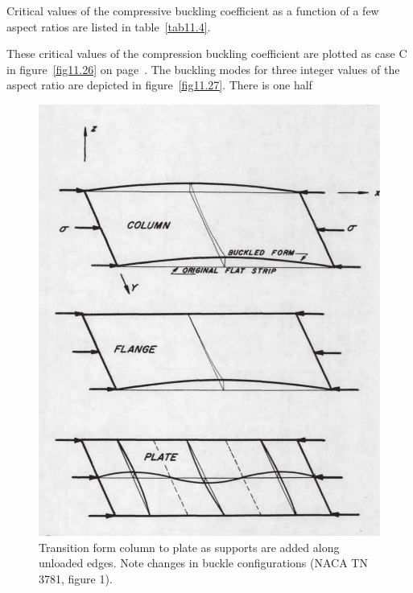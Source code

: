 \documentclass{AeroStructure-ERJohnson}
\begin{document}
\vspace*{-1pc}

Critical values of the compressive buckling coefficient as a function of a few aspect ratios are listed in table~\ref{tab11.4}.

These critical values of the compression buckling coefficient are plotted as case C in figure~\ref{fig11.26} on page~\pageref{fig11.26}. The buckling modes for three integer values of the aspect ratio are depicted in figure~\ref{fig11.27}. There is one half{\parfillskip=0pt\par}
\vspace*{8pt}
\pagebreak

\begin{figure}
\vspace*{-7pt}
\centerline{\includegraphics{Figure_11-25.pdf}}
\caption{Transition form column to plate as supports are added along unloaded edges. Note changes in buckle configurations (NACA TN 3781, figure 1).} \label{fig11.25}
\vspace*{7pt}
\end{figure}
\end{document}
